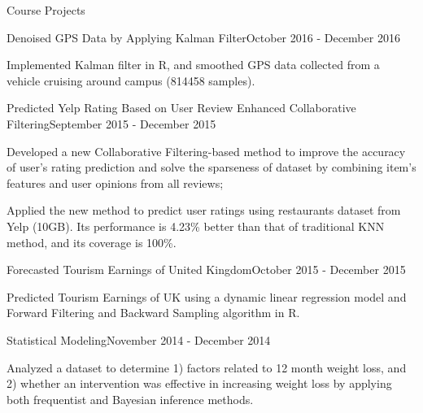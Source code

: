 \documentclass{my_resume} %
\begin{document}
\begin{rSection}{Course Projects}

\begin{rSubsection}{Denoised GPS Data by Applying Kalman Filter}{}{October
    2016 - December 2016}
  \item Implemented Kalman filter in R, and smoothed GPS data collected from a
  vehicle cruising around campus (814458 samples).
\end{rSubsection}

\begin{rSubsection}{Predicted Yelp Rating Based on User Review Enhanced
  Collaborative Filtering}{}{September 2015 - December 2015}
  \item Developed a new Collaborative Filtering-based method to improve the
    accuracy of user's rating prediction and solve the sparseness of dataset by
    combining item's features and user opinions from all reviews;
  \item Applied the new method to predict user ratings using restaurants dataset
    from Yelp (10GB). Its performance is 4.23\% better than that of traditional KNN
    method, and its coverage is 100\%.
\end{rSubsection}

\begin{rSubsection}{Forecasted Tourism Earnings of United Kingdom}{}{October
  2015 - December 2015}
  \item Predicted Tourism Earnings of UK using a dynamic linear
    regression model and Forward Filtering and Backward Sampling algorithm in
    R.
\end{rSubsection}

\begin{rSubsection}{Statistical Modeling}{}{November 2014 - December 2014}
  \item Analyzed a dataset to determine 1) factors related to 12 month weight
  loss, and 2) whether an intervention was effective in increasing weight loss by
  applying both frequentist and Bayesian inference methods.
\end{rSubsection}
\end{rSection}

\end{document}
